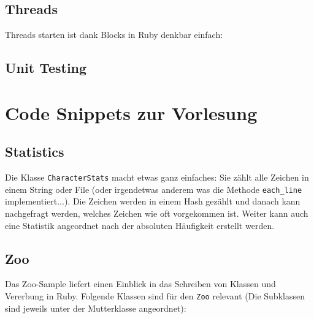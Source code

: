 \documentclass[a4book,11pt,twoside]{scrbook}
\begin{document}








\section{Threads} %
\label{sec:threads}
Threads starten ist dank Blocks in Ruby denkbar einfach:




\section{Unit Testing} %
\label{sec:unit_testing}











\chapter{Code Snippets zur Vorlesung}


\section{Statistics} %
\label{sec:statistics}
Die Klasse \texttt{CharacterStats} macht etwas ganz einfaches: Sie zählt alle Zeichen in einem String oder File (oder irgendetwas anderem was die Methode \texttt{each\_line} implementiert...).
Die Zeichen werden in einem Hash gezählt und danach kann nachgefragt werden, welches Zeichen wie oft vorgekommen ist. Weiter kann auch eine Statistik angeordnet nach der absoluten Häufigkeit erstellt werden.


\section{Zoo} %
\label{sec:zoo}
Das Zoo-Sample liefert einen Einblick in das Schreiben von Klassen und Vererbung in Ruby. Folgende Klassen sind für den \texttt{Zoo} relevant (Die Subklassen sind jeweils unter der Mutterklasse angeordnet):
\end{document}
